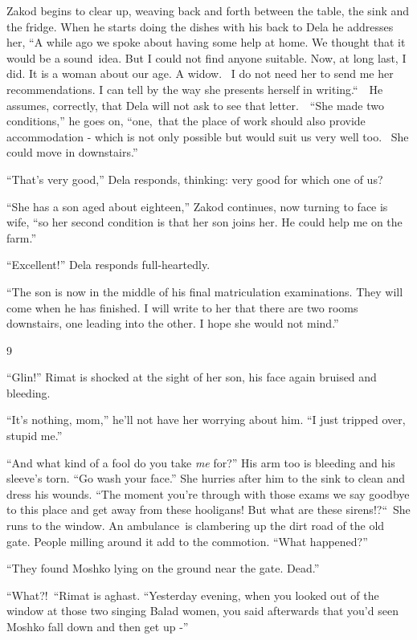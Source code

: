 \documentclass[twoside,11pt]{book}
\begin{document}
Zakod begins to clear up, weaving back and forth between the table, the sink and the fridge. When he starts doing the
dishes with his back to Dela he addresses her, ``A while ago we spoke about having some help at home. We
thought that it would be a sound\ idea. But I could not find anyone suitable. Now, at long last, I did. It is a woman
about our age. A widow.~ I do not need her to send me her recommendations. I can tell by the way she presents herself
in writing.``\ \ He assumes, correctly, that Dela will not ask to see that letter.\ \ ``She
made two conditions,'' he goes on, ``one,~that the place of work should also provide accommodation - which
is not only possible but would suit us very well too.~ She could move in downstairs.'' 

``That's very good,'' Dela responds, thinking: very good for which one of us? 

``She has a son aged about eighteen,'' Zakod continues, now turning to face is wife,
``so her second condition is that her son joins her. He could help me on the farm.'' 

``Excellent!'' Dela responds full-heartedly.

{}``The son is now in the middle of his final matriculation examinations. They will come when he has finished. I will
write to her that there are two rooms downstairs, one leading into the other. I hope she would not mind.''


\bigskip

9

``Glin!'' Rimat is shocked at the sight of her son, his face again bruised and bleeding.

``It's nothing, mom,'' he'll not have her worrying about him. ``I just tripped over, stupid
me.'' 

``And what kind of a fool do you take \textit{me} for?'' His arm too is bleeding and his
sleeve's torn. ``Go wash your face.'' She hurries after him to the sink to clean and dress
his wounds. ``The moment you're through with those exams we say goodbye to this place and get away from
these hooligans! But what are these sirens!?``\ She runs to the window. An ambulance~is clambering up the
dirt road of the old gate. People milling around it add to the commotion. ``What happened?''

``They found Moshko lying on the ground near the gate. Dead.'' 

``What?!\ ``Rimat is aghast{. }``Yesterday evening, when you
looked out of the window at those two singing Balad women, you said afterwards that you'd seen Moshko fall down and
then get up -'' 
\end{document}
